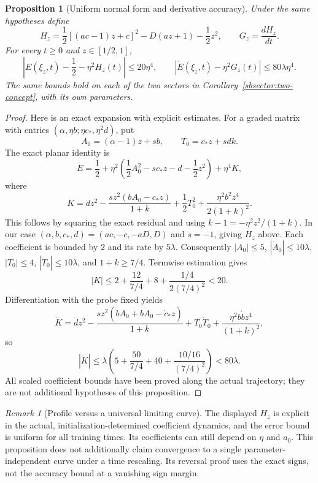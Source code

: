\documentclass{article} %
\theoremstyle{plain}
\newtheorem{proposition}[theorem]{Proposition}
\theoremstyle{definition}
\theoremstyle{remark}
\newtheorem{remark}[theorem]{Remark}
\begin{document}
\begin{proposition}[Uniform normal form and derivative accuracy]
\label{sbsector:profile}
Under the same hypotheses define
\[
 H_z=\frac12[(ac-1)z+c]^2-D(az+1)-\frac12z^2,
 \qquad G_z=\frac{dH_z}{dt}.
\]
For every $t\ge0$ and $z\in[1/2,1]$,
\[
 \left|E(\xi_z,t)-\frac12-\eta^2H_z(t)\right|\le20\eta^4,
 \qquad
 |\dot E(\xi_z,t)-\eta^2G_z(t)|\le80\lambda\eta^4.
\]
The same bounds hold on each of the two sectors in
Corollary~\ref{sbsector:two-concept}, with its own parameters.
\end{proposition}
\begin{proof}
Here is an exact expansion with explicit estimates. For a graded matrix
with entries $(\alpha,\eta b;\eta c_*,\eta^2d)$, put
\[
 A_0=(\alpha-1)z+s b,\qquad T_0=c_*z+s d k.
\]
The exact planar identity is
\[
 E=\frac12+\eta^2\left(\frac12A_0^2-s c_*z-d-\frac12z^2\right)
                  +\eta^4K,
\]
where
\[
 K=dz^2-\frac{s z^2(bA_0-c_*z)}{1+k}
       +\frac12T_0^2+\frac{\eta^2b^2z^4}{2(1+k)^2}.
\]
This follows by squaring the exact residual and using
$k-1=-\eta^2z^2/(1+k)$. In our case
$(\alpha,b,c_*,d)=(ac,-c,-aD,D)$ and $s=-1$, giving $H_z$ above.
Each coefficient is bounded by $2$ and its rate by $5\lambda$.
Consequently $|A_0|\le5$, $|\dot A_0|\le10\lambda$,
$|T_0|\le4$, $|\dot T_0|\le10\lambda$, and $1+k\ge7/4$.
Termwise estimation gives
\[
 |K|\le2+\frac{12}{7/4}+8+\frac{1/4}{2(7/4)^2}<20.
\]
Differentiation with the probe fixed yields
\[
 \dot K=\dot d z^2
 -\frac{s z^2(\dot b A_0+b\dot A_0-\dot c_*z)}{1+k}
 +T_0\dot T_0
 +\frac{\eta^2b\dot b z^4}{(1+k)^2},
\]
so
\[
 |\dot K|\le\lambda\left(5+\frac{50}{7/4}+40
                                  +\frac{10/16}{(7/4)^2}\right)<80\lambda.
\]
All scaled coefficient bounds have been proved along the actual
trajectory; they are not additional hypotheses of this proposition.
\end{proof}

\begin{remark}[Profile versus a universal limiting curve]
The displayed $H_z$ is explicit in the actual, initialization-determined
coefficient dynamics, and the error bound is uniform for all training
times. Its coefficients can still depend on $\eta$ and $a_0$.
This proposition does not additionally claim convergence to a single
parameter-independent curve under a time rescaling. Its reversal proof
uses the exact signs, not the accuracy bound at a vanishing sign margin.
\end{remark}
\end{document}
